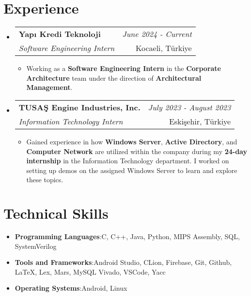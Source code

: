 \documentclass[a4paper,11pt]{article}
\makeatletter
\newcommand{\resumeItem}[2]{
    \item{\textbf{#1}{:\hspace{0.5mm}#2 \vspace{-0.5mm}}}
}
\newcommand{\resumeProject}[4]{
\vspace{0.5mm}\item
    \begin{tabular*}{0.98\textwidth}[t]{l@{\extracolsep{\fill}}r}
    \textbf{#1} & \textit{\footnotesize{#3}} \\
    \footnotesize{\textit{#2}} & \footnotesize{#4}\end{tabular*}\vspace{-2.4mm}
}
\newcommand{\resumeSubItem}[2]{\resumeItem{#1}{#2}\vspace{-4pt}}
\newcommand{\resumeSubHeadingListStart}{\begin{itemize}[leftmargin=*,labelsep=0mm]}
\newcommand{\resumeHeadingSkillStart}{\begin{itemize}[leftmargin=*,itemsep=1.7mm, rightmargin=2ex]}
\newcommand{\resumeItemListStart}{\begin{justify}\begin{itemize}[leftmargin=3ex, rightmargin=2ex, noitemsep,labelsep=1.2mm,itemsep=0mm]\small}
\newcommand{\resumeSubHeadingListEnd}{\end{itemize}\vspace{2mm}}
\newcommand{\resumeHeadingSkillEnd}{\end{itemize}\vspace{-2mm}}
\newcommand{\resumeItemListEnd}{\end{itemize}\end{justify}\vspace{-2mm}}
\makeatother
\begin{document}

\section{\textbf{Experience}}
    \resumeSubHeadingListStart
        \resumeProject
            {Yapı Kredi Teknoloji} {Software Engineering Intern}
            {June 2024 - Current} {Kocaeli, Türkiye}
                \resumeItemListStart
                    \item {Working as a {\textbf{Software Engineering Intern}} in the {\textbf{Corporate Architecture}} team under the direction of {\textbf{Architectural Management}}.}
                \resumeItemListEnd
        \resumeProject
            {TUSAŞ Engine Industries, Inc.} {Information Technology Intern}
            {July 2023 - August 2023} {Eskişehir, Türkiye}
                \resumeItemListStart
                    \item {Gained experience in how {\textbf{Windows Server}}, {\textbf{Active Directory}}, and {\textbf{Computer Network}} are utilized within the company during my {\textbf{24-day internship}} in the Information Technology department. I worked on setting up demos on the assigned Windows Server to learn and explore these topics.}
                \resumeItemListEnd
    \resumeSubHeadingListEnd
\vspace{-6.5mm}


\section{\textbf{Technical Skills}}
\vspace{1mm}
    \resumeHeadingSkillStart
        \resumeSubItem{Programming Languages}
            {C, C++, Java, Python, MIPS Assembly, SQL, SystemVerilog}
        \resumeSubItem{Tools and Frameworks}
            {Android Studio, CLion, Firebase, Git, Github, LaTeX, Lex, Mars, MySQL Vivado, VSCode, Yacc}
        \resumeSubItem{Operating Systems}
            {Android, Linux}
    \resumeHeadingSkillEnd
\vspace{-1mm}

\end{document}
